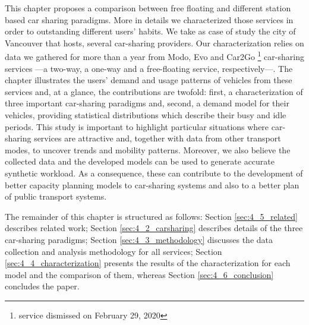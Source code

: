 This chapter proposes a comparison between free floating and different station based car sharing paradigms. More in details we characterized those services in order to outstanding different users' habits. We take as case of study the city of Vancouver that hosts, several car-sharing providers. Our characterization relies on data we gathered for more than a year from Modo, Evo and Car2Go \footnote{service dismissed on February 29, 2020} car-sharing services ---a two-way, a one-way and a free-floating service, respectively---.
The chapter illustrates the users' demand and usage patterns of vehicles from these services and, at a glance, the contributions are twofold: first, a characterization of three important car-sharing paradigms and, second,  a demand model for their vehicles, providing statistical distributions which describe their busy and idle periods. 
This study is important to highlight particular situations where car-sharing services are attractive and, together with data from other transport modes, to uncover trends and mobility patterns. Moreover, we also believe the collected data and the developed models can be used to generate accurate synthetic workload. As a consequence, these can contribute to the development of better capacity planning models to car-sharing systems and also to a better plan of public transport systems.


The remainder of this chapter is structured as follows:  Section \ref{sec:4_5_related} describes related work; Section \ref{sec:4_2_carsharing} describes details of the three car-sharing paradigms; Section \ref{sec:4_3_methodology} discusses the data collection and analysis methodology for all services; Section \ref{sec:4_4_characterization} presents the results of the characterization for each model and the comparison of them, whereas Section \ref{sec:4_6_conclusion} concludes the paper.


